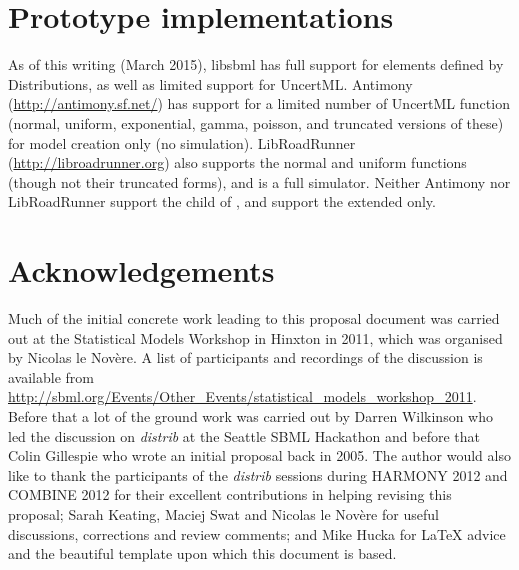 \documentclass[draftspec]{sbmlpkgspec}
\newcommand{\Distribution}{\defRef{Distribution}{distributionOrSample-class}}
\newcommand{\distribshort}{\emph{distrib}\xspace}
\newcommand{\distrib}{Distributions\xspace}
\newcommand{\uncertml}{UncertML\xspace}
\begin{document}






\section{Prototype implementations}

As of this writing (March 2015), libsbml has full support for elements defined by \distrib, as well as limited support for \uncertml.  Antimony (\url{http://antimony.sf.net/}) has support for a limited number of \uncertml function (normal, uniform, exponential, gamma, poisson, and truncated versions of these) for model creation only (no simulation).  LibRoadRunner (\url{http://libroadrunner.org}) also supports the normal and uniform functions (though not their truncated forms), and is a full simulator.  Neither Antimony nor LibRoadRunner support the  child of \SBase, and support the extended \FunctionDefinition only.



\section{Acknowledgements}
\label{sec:acknowledgements}

Much of the initial concrete work leading to this proposal document
was carried out at the Statistical Models Workshop in Hinxton in 2011,
which was organised by Nicolas le Nov\`{e}re. A list of participants
and recordings of the discussion is available from
\url{http://sbml.org/Events/Other_Events/statistical_models_workshop_2011}.
Before that a lot of the ground work was carried out by Darren
Wilkinson who led the discussion on \distribshort at the Seattle SBML
Hackathon and before that Colin Gillespie who wrote an initial
proposal back in 2005. The author would also like to thank the
participants of the \distribshort sessions during HARMONY 2012 and
COMBINE 2012 for their excellent contributions in helping revising
this proposal; Sarah Keating, Maciej Swat and Nicolas le Nov\`{e}re
for useful discussions, corrections and review comments; and Mike
Hucka for \LaTeX{} advice and the beautiful template upon which this
document is based.
\end{document}
